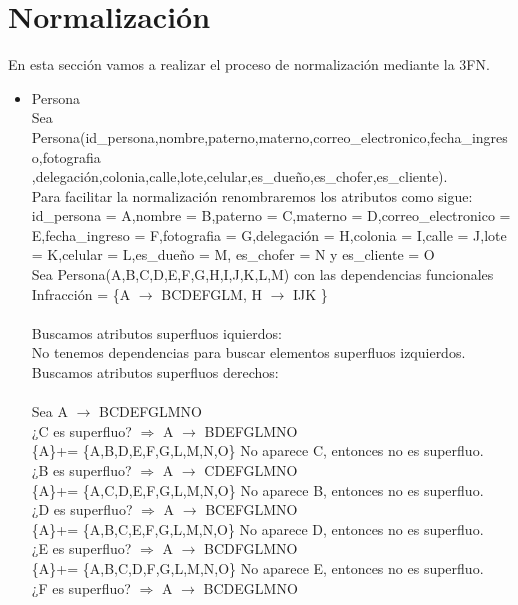 \documentclass{article}
\begin{document}
\section{Normalización}
En esta sección vamos a realizar el proceso de normalización mediante la 3FN.\\
\begin{itemize}


\item Persona\\
Sea Persona(id\_persona,nombre,paterno,materno,correo\_electronico,fecha\_ingreso,fotografia\\,delegación,colonia,calle,lote,celular,es\_dueño,es\_chofer,es\_cliente).\\
Para facilitar la normalización renombraremos los atributos como sigue:
id\_persona = A,nombre = B,paterno = C,materno = D,correo\_electronico = E,fecha\_ingreso = F,fotografia = G,delegación = H,colonia = I,calle = J,lote = K,celular = L,es\_dueño = M, es\_chofer = N y es\_cliente = O\\
Sea Persona(A,B,C,D,E,F,G,H,I,J,K,L,M) con las dependencias funcionales 
Infracción = \{A $\rightarrow$ BCDEFGLM, H $\rightarrow$ IJK  \} \\
\\
Buscamos atributos superfluos iquierdos:\\
No tenemos dependencias para buscar elementos superfluos izquierdos.\\
Buscamos atributos superfluos derechos:\\
\\
Sea A $\rightarrow$ BCDEFGLMNO\\
¿C es superfluo? $\Rightarrow$ A $\rightarrow$ BDEFGLMNO \\
\{A\}+= \{A,B,D,E,F,G,L,M,N,O\} No aparece C, entonces no es superfluo.\\
¿B es superfluo? $\Rightarrow$ A $\rightarrow$ CDEFGLMNO \\
\{A\}+= \{A,C,D,E,F,G,L,M,N,O\} No aparece B, entonces no es superfluo.\\
¿D es superfluo? $\Rightarrow$ A $\rightarrow$ BCEFGLMNO \\
\{A\}+= \{A,B,C,E,F,G,L,M,N,O\}  No aparece D, entonces no es superfluo.\\
¿E es superfluo? $\Rightarrow$ A $\rightarrow$ BCDFGLMNO \\
\{A\}+= \{A,B,C,D,F,G,L,M,N,O\}  No aparece E, entonces no es superfluo.\\
¿F es superfluo? $\Rightarrow$ A $\rightarrow$ BCDEGLMNO \\

\end{itemize}
\end{document}

